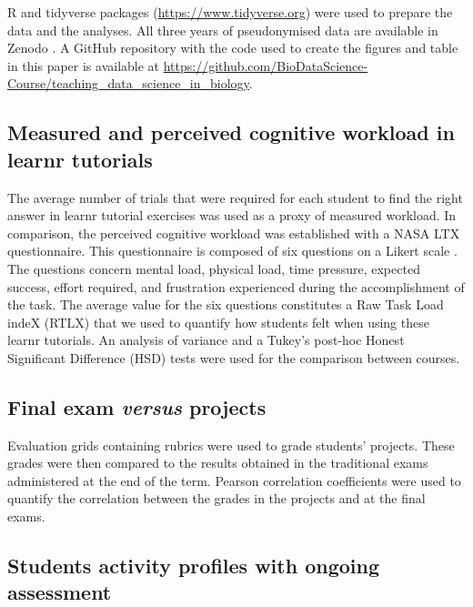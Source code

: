 \documentclass{aims}
\theoremstyle{definition}
\begin{document}
R and tidyverse \cite{Wickham2019} packages
(\url{https://www.tidyverse.org}) were used to prepare the data and the
analyses. All three years of pseudonymised data are available in Zenodo
\cite{Grosjeandataset2020, Grosjeandataset2019, Grosjeandataset2018}. A
GitHub repository with the code used to create the figures and table in
this paper is available at
\url{https://github.com/BioDataScience-Course/teaching_data_science_in_biology}.

\hypertarget{measured-and-perceived-cognitive-workload-in-learnr-tutorials}{%
\subsection{Measured and perceived cognitive workload in learnr
tutorials}\label{measured-and-perceived-cognitive-workload-in-learnr-tutorials}}

The average number of trials that were required for each student to find
the right answer in learnr tutorial exercises was used as a proxy of
measured workload. In comparison, the perceived cognitive workload was
established with a NASA LTX questionnaire. This questionnaire is
composed of six questions on a Likert scale \cite{Hart1988}. The
questions concern mental load, physical load, time pressure, expected
success, effort required, and frustration experienced during the
accomplishment of the task. The average value for the six questions
constitutes a Raw Task Load indeX (RTLX) \cite{Byers1989} that we used
to quantify how students felt when using these learnr tutorials. An
analysis of variance and a Tukey's post-hoc Honest Significant
Difference (HSD) tests were used for the comparison between courses.

\hypertarget{final-exam-versus-projects}{%
\subsection{\texorpdfstring{Final exam \emph{versus}
projects}{Final exam versus projects}}\label{final-exam-versus-projects}}

Evaluation grids containing rubrics were used to grade students'
projects. These grades were then compared to the results obtained in the
traditional exams administered at the end of the term. Pearson
correlation coefficients were used to quantify the correlation between
the grades in the projects and at the final exams.

\hypertarget{students-activity-profiles-with-ongoing-assessment}{%
\subsection{Students activity profiles with ongoing
assessment}\label{students-activity-profiles-with-ongoing-assessment}}
\end{document}
